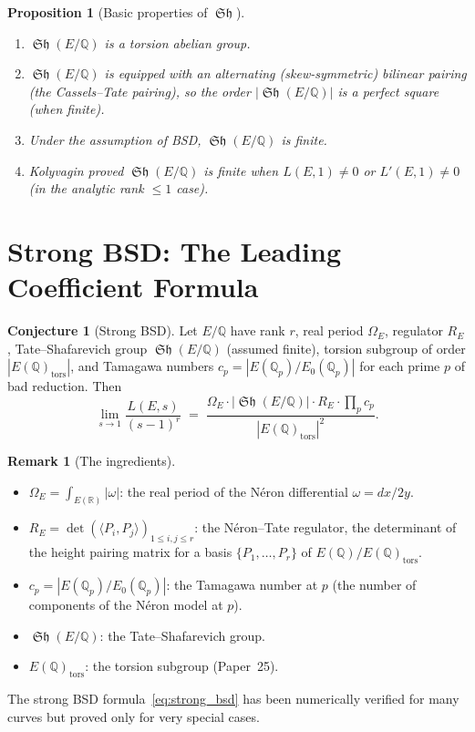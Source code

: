 \documentclass[12pt,a4paper]{amsart}
\newtheorem{proposition}[theorem]{Proposition}
\theoremstyle{definition}
\newtheorem{remark}[theorem]{Remark}
\newtheorem{conjecture}[theorem]{Conjecture}
\newcommand{\Q}{\mathbb{Q}}
\newcommand{\R}{\mathbb{R}}
\DeclareMathOperator{\Sha}{\mathfrak{Sh}}
\begin{document}
\begin{proposition}[Basic properties of $\Sha$]
\label{prop:sha_basic}
\begin{enumerate}
  \item[\textup{(i)}] $\Sha(E/\Q)$ is a torsion abelian group.
  \item[\textup{(ii)}] $\Sha(E/\Q)$ is equipped with an alternating
    (skew-symmetric) bilinear pairing (the Cassels--Tate pairing),
    so the order $|\Sha(E/\Q)|$ is a perfect square (when finite).
  \item[\textup{(iii)}] Under the assumption of BSD, $\Sha(E/\Q)$ is finite.
  \item[\textup{(iv)}] Kolyvagin proved $\Sha(E/\Q)$ is finite when
    $L(E,1) \ne 0$ or $L'(E,1) \ne 0$ (in the analytic rank $\le 1$ case).
\end{enumerate}
\end{proposition}

\section{Strong BSD: The Leading Coefficient Formula}

\begin{conjecture}[Strong BSD]
\label{conj:strong_bsd}
Let $E/\Q$ have rank $r$, real period $\Omega_E$, regulator $R_E$,
Tate--Shafarevich group $\Sha(E/\Q)$ (assumed finite), torsion subgroup
of order $|E(\Q)_{\mathrm{tors}}|$, and Tamagawa numbers $c_p = |E(\Q_p)/E_0(\Q_p)|$
for each prime $p$ of bad reduction.  Then
\begin{equation}
  \label{eq:strong_bsd}
  \lim_{s \to 1} \frac{L(E,s)}{(s-1)^r}
  \;=\;
  \frac{\Omega_E \cdot |\Sha(E/\Q)| \cdot R_E \cdot \prod_p c_p}
       {|E(\Q)_{\mathrm{tors}}|^2}.
\end{equation}
\end{conjecture}

\begin{remark}[The ingredients]
\begin{itemize}
  \item $\Omega_E = \int_{E(\R)} |\omega|$: the real period of the
    N\'eron differential $\omega = dx/2y$.
  \item $R_E = \det(\langle P_i, P_j\rangle)_{1 \le i,j \le r}$: the
    N\'eron--Tate regulator, the determinant of the height pairing matrix
    for a basis $\{P_1,\ldots,P_r\}$ of $E(\Q)/E(\Q)_{\mathrm{tors}}$.
  \item $c_p = |E(\Q_p) / E_0(\Q_p)|$: the Tamagawa number at $p$
    (the number of components of the N\'eron model at $p$).
  \item $\Sha(E/\Q)$: the Tate--Shafarevich group.
  \item $E(\Q)_{\mathrm{tors}}$: the torsion subgroup (Paper~25).
\end{itemize}
The strong BSD formula~\eqref{eq:strong_bsd} has been numerically verified
for many curves but proved only for very special cases.
\end{remark}
\end{document}
